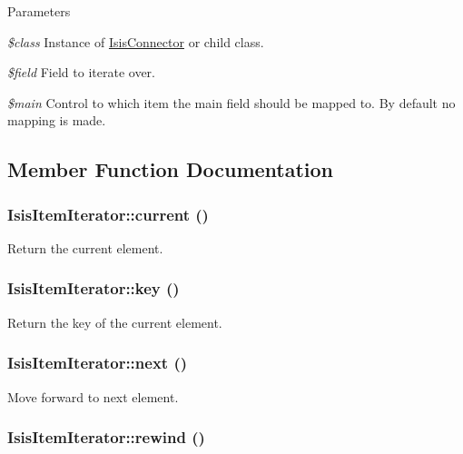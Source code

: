 \begin{DoxyParams}{Parameters}
\item[{\em \$class}]Instance of \hyperlink{classIsisConnector}{IsisConnector} or child class.\item[{\em \$field}]Field to iterate over.\item[{\em \$main}]Control to which item the main field should be mapped to. By default no mapping is made. \end{DoxyParams}


\subsection{Member Function Documentation}
\hypertarget{classIsisItemIterator_a3f602399a600d7b95d23b87111d0e72b}{
\subsubsection[{current}]{\setlength{\rightskip}{0pt plus 5cm}IsisItemIterator::current ()}}
\label{classIsisItemIterator_a3f602399a600d7b95d23b87111d0e72b}
Return the current element. \hypertarget{classIsisItemIterator_ab51757f546b7d9efb9decd701a38b8b5}{
\subsubsection[{key}]{\setlength{\rightskip}{0pt plus 5cm}IsisItemIterator::key ()}}
\label{classIsisItemIterator_ab51757f546b7d9efb9decd701a38b8b5}
Return the key of the current element. \hypertarget{classIsisItemIterator_a17c6a2e50a0ca67feb92f4ffc4cbec23}{
\subsubsection[{next}]{\setlength{\rightskip}{0pt plus 5cm}IsisItemIterator::next ()}}
\label{classIsisItemIterator_a17c6a2e50a0ca67feb92f4ffc4cbec23}
Move forward to next element. \hypertarget{classIsisItemIterator_ab87a4387a9fd745366ccf8e138a9f60c}{
\subsubsection[{rewind}]{\setlength{\rightskip}{0pt plus 5cm}IsisItemIterator::rewind ()}}

